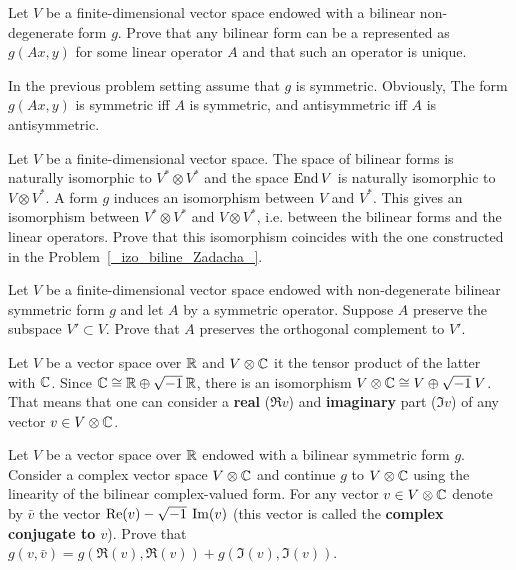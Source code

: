 \documentclass[12pt]{article}
\begin{document}
\begin{zadacha}\label{_izo_biline_Zadacha_}
Let $V$ be a finite-dimensional vector space endowed with a bilinear
non-degenerate form $g$. Prove that any bilinear form can be a
represented as $g(Ax, y)$ for some linear operator $A$ and that such
an operator is unique.
\end{zadacha}

\begin{zamechanie}
In the previous problem setting assume that
$g$ is symmetric. Obviously, The form $g(Ax, y)$ is symmetric iff  
$A$ is symmetric, and antisymmetric iff $A$ is antisymmetric.
\end{zamechanie}

\begin{zadacha}
Let $V$ be a finite-dimensional vector space. The space of bilinear
forms is naturally isomorphic to  $V^*\otimes V^*$ and the space $\operatorname{End}
V$ is naturally isomorphic to $V\otimes V^*$. A form $g$ induces an
isomorphism between  $V$ and $V^*$. This gives an isomorphism between
$V^*\otimes V^*$ and $V\otimes V^*$, i.e. between the bilinear forms
and the linear operators. Prove that this isomorphism coincides with
the one constructed in the Problem~\ref{_izo_biline_Zadacha_}.
\end{zadacha}

\begin{zadacha}[!]\label{_sokhra_podpro_Zadacha_}
Let $V$ be a finite-dimensional vector space endowed with
non-degenerate bilinear symmetric form $g$ and let $A$ by  a symmetric
operator. Suppose $A$ preserve the subspace  $V'\subset V$. Prove that
$A$ preserves the orthogonal complement to  $V'$.
\end{zadacha}

\begin{opredelenie}
  Let $V$ be a vector space over ${\mathbb R}$ and $V \otimes {\mathbb C}$ it the tensor
  product of the latter with ${\mathbb C}$. Since ${\mathbb C} \cong {\mathbb R} \oplus \sqrt{-1}\:{\mathbb R}$,
  there is an isomorphism $V\otimes {\mathbb C}\cong V\oplus \sqrt{-1}\: V$. That means
  that one can consider a \textbf{real} ($\Re v$) and \textbf{imaginary}
  part ($\Im v$) of any vector $v\in V\otimes {\mathbb C}$.
\end{opredelenie}

\begin{zadacha}\label{_okompleksi_Zadacha_}
  Let $V$ be a vector space over ${\mathbb R}$ endowed with a bilinear
  symmetric form $g$. Consider a complex vector space $V\otimes {\mathbb C}$
  and continue $g$ to $V\otimes {\mathbb C}$ using the linearity of the
  bilinear complex-valued form.  For any vector $v\in V\otimes {\mathbb C}$
  denote by $\bar v$ the vector $\operatorname{Re}(v) - \sqrt{-1}\: \operatorname{Im}(v)$ (this vector is
  called the {\bf complex conjugate to $v$}). Prove that $g(v, \bar v)
  = g(\Re(v), \Re(v))+g(\Im(v), \Im(v))$.
\end{zadacha}
\end{document}
